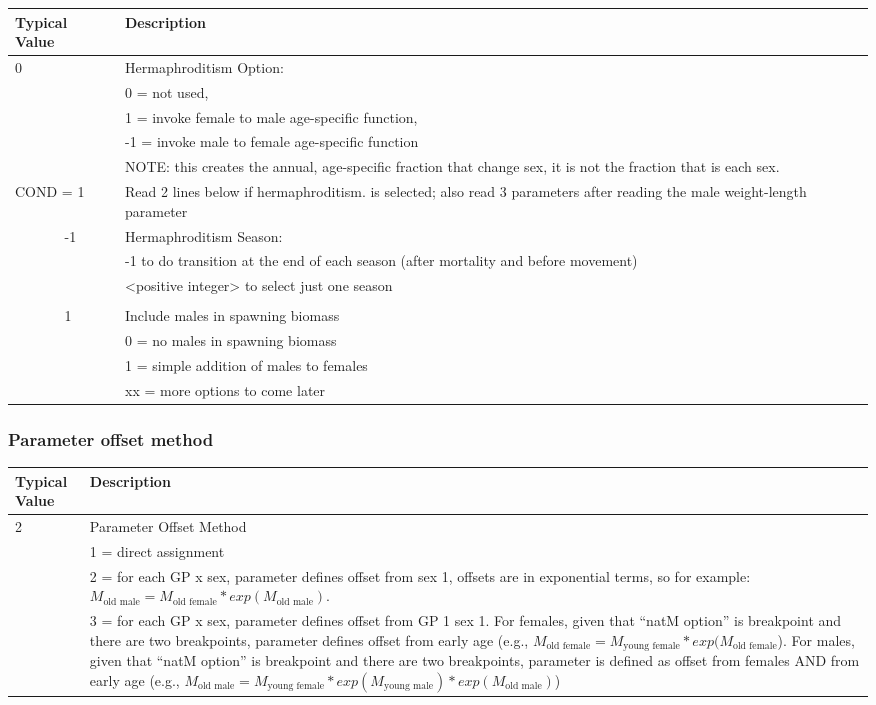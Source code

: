 \begin{longtable}{p{0.5cm} p{2cm} p{12cm}}
	  \multicolumn{2}{l}{Typical Value} & Description \\
	  \hline
	  0 & & Hermaphroditism Option:\\
	   &  & 0 = not used, \\
	   &  & 1 = invoke female to male age-specific function, \\
	   &  & -1 = invoke male to female age-specific function \\
	   &  & NOTE:  this creates the annual, age-specific fraction that change sex, it is not the fraction that is each sex.\\
	  \hline

	  \multicolumn{2}{l}{COND = 1}& Read 2 lines below if hermaphroditism. is selected; also read 3 parameters after reading the male weight-length parameter\\
	  & -1 & Hermaphroditism Season: \\
	  &    & -1 to do transition at the end of each season (after mortality and before movement)\\
	  &    & <positive integer> to select just one season\\
	  \\
	  & 1  & Include males in spawning biomass \\
	  &    & 0 = no males in spawning biomass \\
	  &    & 1 = simple addition of males to females\\
	  &    & xx = more options to come later \\
	  \hline
	\end{longtable}


\subsubsection{Parameter offset method}

\begin{longtable}{p{0.5cm} p{2cm} p{12cm}}
	\multicolumn{2}{l}{Typical Value} & Description \\
	\hline
	  2 & & Parameter Offset Method \\
	    & & 1 = direct assignment \\
	    & & 2 = for each GP x sex, parameter defines offset from sex 1, offsets are in exponential terms, so for example: $M_{\text{old male}} = M_{\text{old female}}*exp(M_{\text{old male}})$. \\
	    & & 3 = for each GP x sex, parameter defines offset from GP 1 sex 1.  For females, given that “natM option” is breakpoint and there are two breakpoints, parameter defines offset from early age (e.g., $M_{\text{old female}} = M_{\text{young female}}*exp(M_{\text{old female}}$). For males, given that “natM option” is breakpoint and there are two breakpoints, parameter is defined as offset from females AND from early age (e.g., $M_{\text{old male}} = M_{\text{young female}}*exp(M_{\text{young male}})*exp(M_{\text{old male}})$)\\
	 \hline
\end{longtable}


